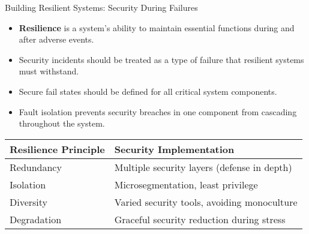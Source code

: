 \documentclass{beamer}
\begin{document}
    \begin{frame}{Building Resilient Systems: Security During Failures}
    \begin{itemize}
    \item \textbf{Resilience} is a system's ability to maintain essential functions during and after adverse events.
    \item Security incidents should be treated as a type of failure that resilient systems must withstand.
    \item Secure fail states should be defined for all critical system components.
    \item Fault isolation prevents security breaches in one component from cascading throughout the system.
    \end{itemize}
    
    \begin{table}
    \begin{tabular}{ll}
    \toprule
    \textbf{Resilience Principle} & \textbf{Security Implementation} \\
    \midrule
    Redundancy & Multiple security layers (defense in depth) \\
    Isolation & Microsegmentation, least privilege \\
    Diversity & Varied security tools, avoiding monoculture \\
    Degradation & Graceful security reduction during stress \\
    \bottomrule
    \end{tabular}
    \end{table}
    \end{frame}
\end{document}
